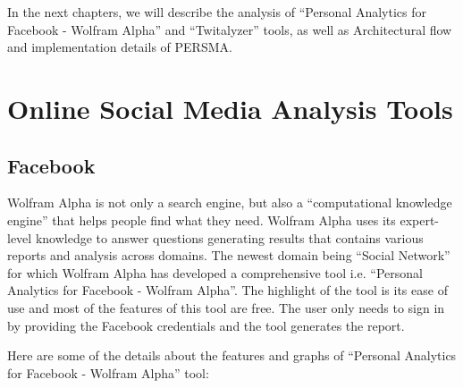 \documentclass[12pt]{ucthesis}
\begin{document}
 In the next chapters, we will describe the analysis of ``Personal Analytics for Facebook - Wolfram Alpha'' and ``Twitalyzer'' tools, as well as Architectural flow and implementation details of PERSMA.

\chapter{Online Social Media Analysis Tools}
\section{Facebook}
Wolfram Alpha \cite{wolfram} is not only a search engine, but also a “computational knowledge engine” that helps people find what they need. Wolfram Alpha uses its expert-level knowledge to answer questions generating results that contains various reports and analysis across domains. The newest domain being ``Social Network'' for which Wolfram Alpha has developed a comprehensive tool i.e. ``Personal Analytics for Facebook - Wolfram Alpha''. The highlight of the tool is its ease of use and most of the features of this tool are free. The user only needs to sign in by providing the Facebook credentials and the tool generates the report.

Here are some of the details about the features and graphs of ``Personal Analytics for Facebook - Wolfram Alpha'' tool:
  
\end{document}
